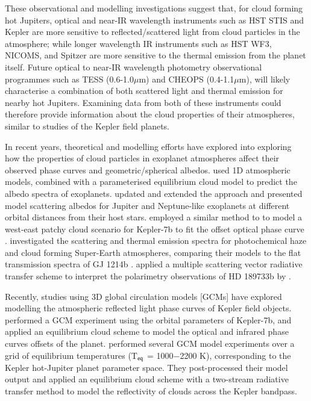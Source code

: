 \documentclass{aa}
\begin{document}
These observational and modelling investigations suggest that, for cloud forming hot Jupiters, optical and near-IR wavelength instruments such as HST STIS and Kepler are more sensitive to reflected/scattered light from cloud particles in the atmosphere;
while longer wavelength IR instruments such as HST WF3, NICOMS, and Spitzer are more sensitive to the thermal emission from the planet itself. 
Future optical to near-IR wavelength photometry observational programmes such as TESS (0.6-1.0$\mu$m) and CHEOPS (0.4-1.1$\mu$m), will likely characterise a combination of both scattered light and thermal emission for nearby hot Jupiters.
Examining data from both of these instruments could therefore provide information about the cloud properties of their atmospheres, similar to studies of the Kepler field planets.

In recent years, theoretical and modelling efforts have explored into exploring how the properties of cloud particles in exoplanet atmospheres affect their observed phase curves and geometric/spherical albedos.
\citet{Marley1999} used 1D atmospheric models, combined with a parameterised equilibrium cloud model to predict the albedo spectra of exoplanets.
\citet{Cahoy2010} updated and extended the \citet{Marley1999} approach and presented model scattering albedos for Jupiter and Neptune-like exoplanets at different orbital distances from their host stars.
\citet{Webber2015} employed a similar method to \citet{Cahoy2010} to model a west-east patchy cloud scenario for Kepler-7b to fit the offset optical phase curve \citep{Demory2013}.
\citet{Morley2015} investigated the scattering and thermal emission spectra for photochemical haze and cloud forming Super-Earth atmospheres, comparing their models to the flat transmission spectra of GJ 1214b \citep{Kreidberg2014}.
\citet{Kopparla2016} applied a multiple scattering vector radiative transfer scheme to interpret the polarimetry observations of HD 189733b by \citet{Wiktotowicz2015}.

Recently, studies using 3D global circulation models [GCMs] have explored modelling the atmospheric reflected light phase curves of Kepler field objects.
\citet{Oreshenko2016} performed a GCM experiment using the orbital parameters of Kepler-7b, and applied an equilibrium cloud scheme to model the optical and infrared phase curves offsets of the planet.
\citet{Parmentier2016} performed several GCM model experiments over a grid of equilibrium temperatures (T$_{\rm eq}$ = 1000$-$2200 K), corresponding to the Kepler hot-Jupiter planet parameter space.
They post-processed their model output and applied an equilibrium cloud scheme with a two-stream radiative transfer method to model the reflectivity of clouds across the Kepler bandpass.
\end{document}
